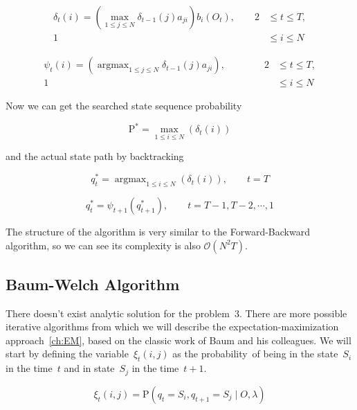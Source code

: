 \documentclass[thesis=M,english]{FITthesis}[2012/10/20]
\newcommand{\argmax}{\mathop{\mathrm{argmax}}}
\begin{document}
\begin{equation}
\begin{aligned}
\delta_{t}(i) = ( \max_{ 1 \leq j \leq N } \delta_{t-1}(j)a_{ji} ) b_i(O_{t}), \qquad 2& \leq t \leq T, \\
																					   1& \leq i \leq N
\end{aligned}
\end{equation}

\begin{equation}
\begin{aligned}
\psi_{t}(i) = ( \argmax_{ 1 \leq j \leq N } \delta_{t-1}(j)a_{ji} ), \qquad \qquad 2& \leq t \leq T, \\
																			1& \leq i \leq N
\end{aligned}
\end{equation}

Now we can get the searched state sequence probability 

\begin{equation}
\mathrm{P}^* = \max_{1 \leq i \leq N} ( \delta_{t}(i) )  
\end{equation}

and the actual state path by backtracking

\begin{equation}
q_t^* = \argmax_{1 \leq i \leq N} ( \delta_{t}(i) ),  \qquad t = T  
\end{equation}

\begin{equation}
q_t^* = \psi_{t+1}(q_{t+1}^*), \qquad t = T-1, T-2, \cdots, 1  
\end{equation}

The structure of the algorithm is very similar to the Forward-Backward algorithm, so we can see its complexity is also $\mathcal{O}(N^2T)$.


\subsection{Baum-Welch Algorithm}\label{sec:BWA}

There doesn't exist analytic solution for the problem~3. There are more possible iterative algorithms from which we will describe the expectation-maximization approach~\ref{ch:EM}, based on the classic work of Baum and his colleagues. We will start by defining the variable~$\xi_t(i,j)$ as the probability~of being in the state~$S_i$ in the time~$t$ and in state~$S_j$ in the time~$t+1$. 

\begin{equation}
\xi_t(i,j) = \mathrm{P}( q_t = S_i, q_{t+1} = S_j \mid O, \lambda )  
\end{equation}
\end{document}
